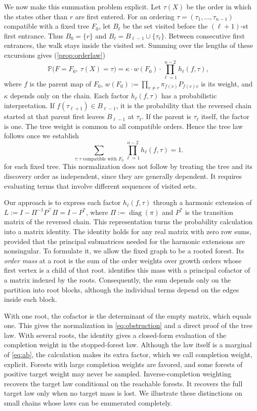 \documentclass[onefignum,onetabnum]{siamart250211}
\numberwithin{theorem}{section}
\numberwithin{equation}{section}
\newcommand{\pr}{\mathbb{P}}
\DeclareMathOperator{\diag}{diag}
\begin{document}
We now make this summation problem explicit. Let $\tau(X)$ be the
order in which the states other than $r$ are first entered. For an
ordering $\tau=(\tau_1,\dots,\tau_{n-1})$ compatible with a fixed tree
$F_0$, let $B_\ell$ be the set visited before the $(\ell+1)$-st first
entrance. Thus $B_0=\{r\}$ and
$B_\ell=B_{\ell-1}\cup\{\tau_\ell\}$. Between consecutive first
entrances, the walk stays inside the visited set. Summing over the
lengths of these excursions gives (\cref{prop:orderlaw})
\begin{equation}\label{eq:obstruction}
\pr\big(F=F_0,\ \tau(X)=\tau\big)
=\kappa\cdot w(F_0)\cdot\prod_{\ell=1}^{n-2}h_{\ell}(f,\tau),
\end{equation}
where $f$ is the parent map of $F_0$,
$w(F_0):=\prod_{v\ne r}\pi_{f(v)}P_{f(v)v}$ is its weight, and
$\kappa$ depends only on the chain. Each factor $h_\ell(f,\tau)$ has a
probabilistic interpretation. If $f(\tau_{\ell+1})\in B_{\ell-1}$, it
is the probability that the reversed chain started at that parent
first leaves $B_{\ell-1}$ at $\tau_\ell$. If the parent is
$\tau_\ell$ itself, the factor is one. The tree weight is common to
all compatible orders. Hence the tree law follows once we establish
\[
\sum_{\tau:\tau\text{ compatible with }F_0}\prod_{\ell=1}^{n-2}h_{\ell}(f,\tau)=1.
\]
for each fixed tree. This normalization does not follow by treating
the tree and its discovery order as independent, since they are
generally dependent. It requires evaluating terms that involve
different sequences of visited sets.

Our approach is to express each factor $h_\ell(f,\tau)$ through a
harmonic extension of
$L:=I-\Pi^{-1}P^{\top}\Pi=I-P^{*}$, where $\Pi:=\diag(\pi)$ and $P^{*}$
is the transition matrix of the reversed chain. This representation
turns the probability calculation into a matrix identity. The
identity holds for any real matrix with zero row sums, provided that
the principal submatrices needed for the harmonic extensions are
nonsingular. To formulate it, we allow the fixed graph to be a rooted
forest. Its \emph{order mass} at a root is the sum of the order weights
over growth orders whose first vertex is a child of that root.
 identifies this mass with a principal cofactor of a
matrix indexed by the roots. Consequently, the sum depends only on the
partition into root blocks, although the individual terms depend on
the edges inside each block.

With one root, the cofactor is the determinant of the empty matrix,
which equals one. This gives the normalization in
\eqref{eq:obstruction} and a direct proof of the tree law. With several
roots, the identity gives a closed-form evaluation of the completion
weight in the stopped-forest law. Although the law itself is a marginal of
\eqref{eq:ab}, the calculation makes its extra factor, which we call completion weight, explicit.
Forests with large completion weights are favored, and some forests
of positive target weight may never be sampled. Inverse-completion
weighting recovers the target law conditional on the reachable
forests. It recovers the full target law only when no target mass is
lost. We illustrate these distinctions on small chains whose laws can
be enumerated completely.
\end{document}
